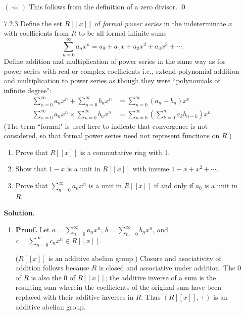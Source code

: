\begin{enumerate}
      $(\Leftarrow)$ This follows from the definition of a zero divisor. \qed      
   \item[7.2.3]   Define the set $R[[x]]$ of \textit{formal power series} in the
                  indeterminate $x$ with coefficients from $R$ to be all formal
                  infinite sums
                  $$\sum_{n=0}^\infty a_nx^n = a_0 + a_1x +
                       a_2x^2 + a_3x^3 + \cdots.$$
                  Define addition and multiplication of power series in the same
                  way as for power series with real or complex coefficients
                  i.e., extend polynomial addition and multiplication to power
                  series as though they were ``polynomials of infinite degree":
                  \begin{align*}
                     \sum_{n=0}^\infty a_nx^n + \sum_{n=0}^\infty b_nx^n &=
                        \sum_{n=0}^\infty (a_n + b_n)x^n \\
                     \sum_{n=0}^\infty a_nx^n \times \sum_{n=0}^\infty b_nx^n &=
                        \sum_{n=0}^\infty\left(\sum_{k=0}^na_kb_{n-k}\right)x^n. 
                  \end{align*}
                  (The term ``formal" is used here to indicate that convergence
                  is not considered, so that formal power series need not
                  represent functions on $R$.)
                  \begin{enumerate}
                     \item Prove that $R[[x]]$ is a commutative ring with 1.
                     \item Show that $1- x$ is a unit in $R[[x]]$ with inverse
                           $1 + x + x^2 + \cdots$.
                     \item Prove that $\sum_{n=0}^\infty a_nx^n$ is a unit in
                           $R[[x]]$ if and only if $a_0$ is a unit in $R$.
                  \end{enumerate}

      \textbf{Solution.}

      \begin{enumerate}
         \item \textbf{Proof.} Let $a = \sum_{n=0}^\infty a_nx^n$,
               $b = \sum_{n=0}^\infty b_nx^n$, and
               $c = \sum_{n=0}^\infty c_nx^n \in R[[x]]$.

               ($R[[x]]$ is an additive abelian group.) Closure and asociativity
               of addition follows because $R$ is closed and associative under
               addition. The 0 of $R$ is also the 0 of $R[[x]]$; the additive
               inverse of a sum is the resulting sum wherein the coefficients of
               the original sum have been replaced with their additive inverses
               in $R$. Thus $(R[[x]], +)$ is an additive abelian group.


\end{enumerate}
\end{enumerate}
